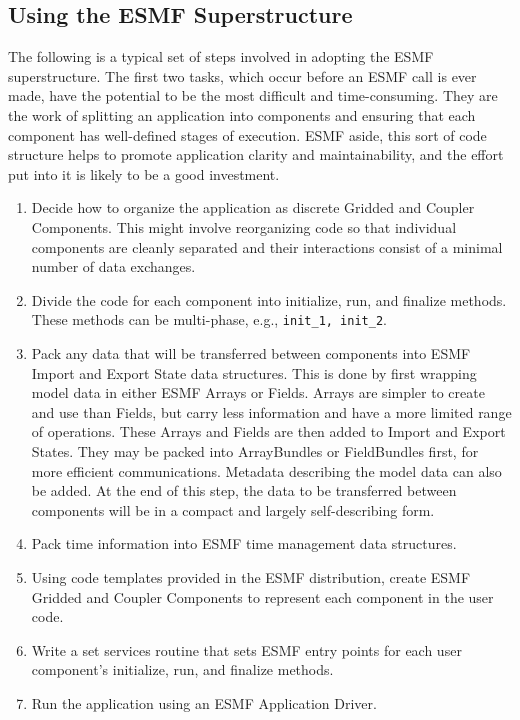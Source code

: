 \subsection{Using the ESMF Superstructure}

The following is a typical set of steps involved in adopting
the ESMF superstructure.  The first two tasks, which occur 
before an ESMF call is ever made, have the potential to be 
the most difficult and time-consuming.  They are the work 
of splitting an application into components and ensuring that
each component has well-defined stages of execution.  ESMF
aside, this sort of code structure helps to promote application
clarity and maintainability, and the effort put into it is likely
to be a good investment.

\begin{enumerate}

\item Decide how to organize the application as discrete Gridded 
and Coupler Components.  This might involve reorganizing code
so that individual components are cleanly separated and their 
interactions consist of a minimal number of data exchanges.

\item Divide the code for each component into initialize, run, and
finalize methods.  These methods can be multi-phase, e.g., 
{\tt init\_1, init\_2}.

\item Pack any data that will be transferred between components
into ESMF Import and Export State data structures.  This is done
by first wrapping model data in either ESMF Arrays or Fields.
Arrays are simpler to create and use than Fields, but carry less
information and have a more limited range of operations.
These Arrays and Fields are then added to Import and
Export States.  They may be packed into ArrayBundles or
FieldBundles first, for more efficient communications.
Metadata describing the model data can also be added.
At the end of this step, the data to be transferred between
components will be in a compact and largely self-describing
form.

\item Pack time information into ESMF time management data 
structures.

\item Using code templates provided in the ESMF distribution, create
ESMF Gridded and Coupler Components to represent each component
in the user code.

\item Write a set services routine that sets ESMF entry 
points for each user component's initialize, run, and finalize 
methods.

\item Run the application using an ESMF Application Driver.

\end{enumerate} 


